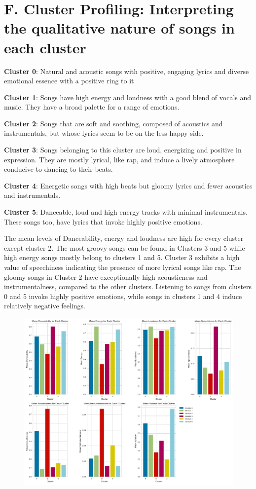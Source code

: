 \documentclass{article}
\begin{document}
\section*{F. Cluster Profiling: Interpreting the qualitative nature of songs in each cluster}
\textbf{Cluster 0}: Natural and acoustic songs with positive, engaging lyrics and diverse emotional essence with a positive ring to it

\textbf{Cluster 1}: Songs have high energy and loudness with a good blend of vocals and music. They have a broad palette for a range of emotions. 

\textbf{Cluster 2}: Songs that are soft and soothing, composed of acoustics and instrumentals, but whose lyrics seem to be on the less happy side.

\textbf{Cluster 3}: Songs belonging to this cluster are loud, energizing and positive in expression. They are mostly lyrical, like rap, and induce a lively atmosphere conducive to dancing to their beats. 

\textbf{Cluster 4}: Energetic songs with high beats but gloomy lyrics and fewer acoustics and instrumentals.

\textbf{Cluster 5}: Danceable, loud and high energy tracks with minimal instrumentals. These songs too, have lyrics that invoke highly positive emotions.

 
The mean levels of Danceability, energy and loudness are high for every cluster except cluster 2. The most groovy songs can be found in Clusters 3 and 5 while high energy songs mostly belong to clusters 1 and 5. Cluster 3 exhibits a high value of speechiness indicating the presence of more lyrical songs like rap. The gloomy songs in Cluster 2 have exceptionally high acousticness and instrumentalness, compared to the other clusters. Listening to songs from clusters 0 and 5 invoke highly positive emotions, while songs in clusters 1 and 4 induce relatively negative feelings.

\label{app:Cluster_profile}
\begin{figure}[H]
    \centering
    \includegraphics[width=1\linewidth]{Images/mean_values_cluster.png}
\end{figure}
\end{document}
